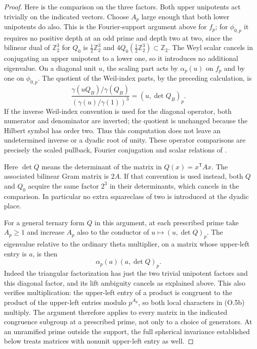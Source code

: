 \documentclass[11pt]{article}
\theoremstyle{definition}
\theoremstyle{remark}
\begin{document}
\begin{proof}
Here is the comparison on the three factors. Both upper unipotents
act trivially on the indicated vectors. Choose $A_p$ large enough
that both lower unipotents do also. This is the Fourier-support
argument above for $f_p$; for $\phi_{0,p}$ it requires no positive
depth at an odd prime and depth two at two, since the bilinear dual
of $\mathbb Z_2^3$ for $Q_0$ is $\tfrac12\mathbb Z_2^3$ and
$4Q_0(\tfrac12\mathbb Z_2^3)\subset\mathbb Z_2$.
The Weyl scalar cancels in conjugating an upper unipotent to a
lower one, so it introduces no additional eigenvalue. On a
diagonal unit $u$, the scaling part acts by $\alpha_p(u)$ on
$f_p$ and by one on $\phi_{0,p}$. The quotient of the Weil-index
parts, by the preceding calculation, is
\[
 \frac{\gamma(uQ_B)/\gamma(Q_B)}
      {(\gamma(u)/\gamma(1))^3}
       =(u,\det Q_B)_p.                                      \tag{O.5a}
\]
If the inverse Weil-index convention is used for the diagonal
operator, both numerator and denominator are inverted; the
quotient is unchanged because the Hilbert symbol has order two.
Thus this computation does not leave an undetermined inverse
or a dyadic root of unity. These operator comparisons are precisely
the scaled pullback, Fourier conjugation and scalar relations of
\cite[I.13--I.14 and II.25--II.28]{weil}.

Here $\det Q$ means the determinant of the matrix in
$Q(x)=x^{\mathsf T}Ax$. The associated bilinear Gram matrix is
$2A$. If that convention is used instead, both $Q$ and $Q_0$
acquire the same factor $2^3$ in their determinants, which cancels
in the comparison. In particular no extra squareclass of two
is introduced at the dyadic place.

For a general ternary form $Q$ in this argument, at each prescribed
prime take $A_p\ge1$ and increase $A_p$
also to the conductor of $u\mapsto(u,\det Q)_p$. The eigenvalue
relative to the ordinary theta multiplier, on a matrix whose
upper-left entry is $a$, is then
\[
                    \alpha_p(a)(a,\det Q)_p.                  \tag{O.5b}
\]
Indeed the triangular factorization has just the two trivial
unipotent factors and this diagonal factor, and its lift ambiguity
cancels as explained above. This also verifies multiplication:
the upper-left entry of a product is congruent to the product
of the upper-left entries modulo $p^{A_p}$, so both local
characters in (O.5b) multiply. The argument therefore applies
to every matrix in the indicated congruence subgroup at a prescribed
prime, not only to a choice of generators. At an unramified prime
outside the support, the full spherical invariance established
below treats matrices with nonunit upper-left entry as well.


\end{proof}
\end{document}
